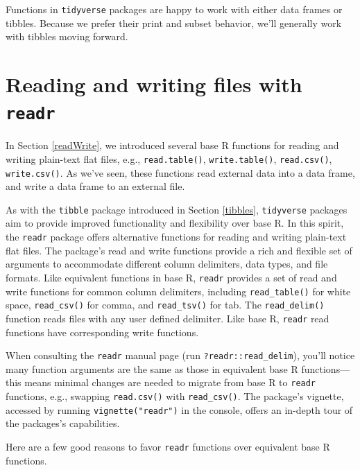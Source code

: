 \documentclass[
  11pt,
]{krantz}
\theoremstyle{definition}
\theoremstyle{definition}
\theoremstyle{definition}
\theoremstyle{definition}
\theoremstyle{remark}
\begin{document}
Functions in \texttt{tidyverse} packages are happy to work with either data frames or tibbles. Because we prefer their print and subset behavior, we'll generally work with tibbles moving forward.

\hypertarget{readr}{%
\section{\texorpdfstring{Reading and writing files with \texttt{readr}}{Reading and writing files with readr}}\label{readr}}

In Section \ref{readWrite}, we introduced several base R functions for reading and writing plain-text flat files, e.g., \texttt{read.table()}, \texttt{write.table()}, \texttt{read.csv()}, \texttt{write.csv()}. As we've seen, these functions read external data into a data frame, and write a data frame to an external file.

As with the \texttt{tibble} package introduced in Section \ref{tibbles}, \texttt{tidyverse} packages aim to provide improved functionality and flexibility over base R. In this spirit, the \texttt{readr} package offers alternative functions for reading and writing plain-text flat files. The package's read and write functions provide a rich and flexible set of arguments to accommodate different column delimiters, data types, and file formats. Like equivalent functions in base R, \texttt{readr} provides a set of read and write functions for common column delimiters, including \texttt{read\_table()} for white space, \texttt{read\_csv()} for comma, and \texttt{read\_tsv()} for tab. The \texttt{read\_delim()} function reads files with any user defined delimiter. Like base R, \texttt{readr} read functions have corresponding write functions.

When consulting the \texttt{readr} manual page (run \texttt{?readr::read\_delim}), you'll notice many function arguments are the same as those in equivalent base R functions---this means minimal changes are needed to migrate from base R to \texttt{readr} functions, e.g., swapping \texttt{read.csv()} with \texttt{read\_csv()}. The package's vignette, accessed by running \texttt{vignette("readr")} in the console, offers an in-depth tour of the packages's capabilities.

Here are a few good reasons to favor \texttt{readr} functions over equivalent base R functions.
\end{document}
